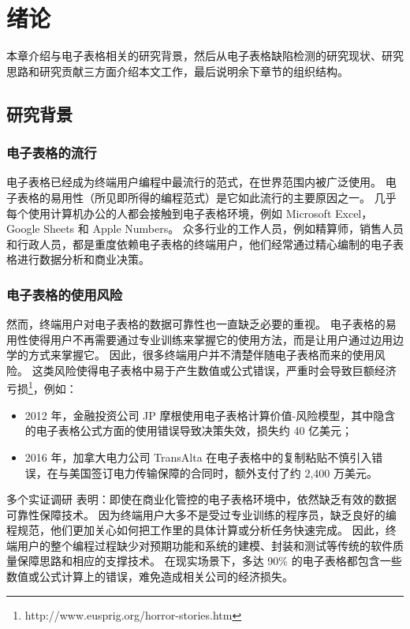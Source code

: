 \chapter{绪论}\label{introduction}
本章介绍与电子表格相关的研究背景，然后从电子表格缺陷检测的研究现状、研究思路和研究贡献三方面介绍本文工作，最后说明余下章节的组织结构。


\section{研究背景}
\subsection{电子表格的流行}
电子表格已经成为终端用户编程中最流行的范式，在世界范围内被广泛使用。
电子表格的易用性（所见即所得的编程范式）是它如此流行的主要原因之一。
几乎每个使用计算机办公的人都会接触到电子表格环境，例如 Microsoft Excel，Google Sheets 和 Apple Numbers。
众多行业的工作人员，例如精算师，销售人员和行政人员，都是重度依赖电子表格的终端用户\cite{scaffidi2005estimating}，他们经常通过精心编制的电子表格进行数据分析和商业决策。

\subsection{电子表格的使用风险}
然而，终端用户对电子表格的数据可靠性也一直缺乏必要的重视。
电子表格的易用性使得用户不再需要通过专业训练来掌握它的使用方法，而是让用户通过边用边学的方式来掌握它。
因此，很多终端用户并不清楚伴随电子表格而来的使用风险。
这类风险使得电子表格中易于产生数值或公式错误，严重时会导致巨额经济亏损\footnote{http://www.eusprig.org/horror-stories.htm}，例如：

\begin{itemize}
    \item 2012 年，金融投资公司 JP 摩根使用电子表格计算价值-风险模型，其中隐含的电子表格公式方面的使用错误导致决策失效，损失约 40 亿美元；
    \item 2016 年，加拿大电力公司 TransAlta 在电子表格中的复制粘贴不慎引入错误，在与美国签订电力传输保障的合同时，额外支付了约 2,400 万美元。
\end{itemize}

多个实证调研 \cite{panko2016we,powell2009impact} 表明：即使在商业化管控的电子表格环境中，依然缺乏有效的数据可靠性保障技术。
因为终端用户大多不是受过专业训练的程序员，缺乏良好的编程规范，他们更加关心如何把工作里的具体计算或分析任务快速完成。
因此，终端用户的整个编程过程缺少对预期功能和系统的建模、封装和测试等传统的软件质量保障思路和相应的支撑技术。
在现实场景下，多达 90\% 的电子表格都包含一些数值或公式计算上的错误\cite{rajalingham2008classification}，难免造成相关公司的经济损失。


